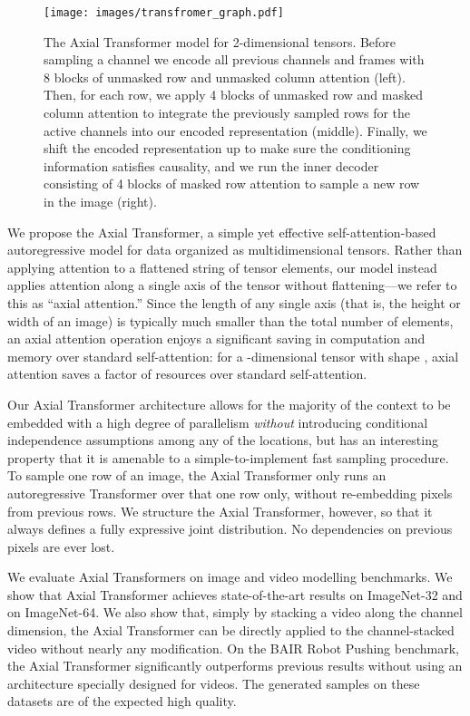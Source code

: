 \documentclass{article} \usepackage{iclr2020_conference,times}
\begin{document}
\begin{figure}[t]
    \centering
    \texttt{[image: images/transfromer\_graph.pdf]}
    \caption{The Axial Transformer model for 2-dimensional tensors. Before sampling a channel we encode all previous channels and frames with 8 blocks of unmasked row and unmasked column attention (left). Then, for each row, we apply 4 blocks of unmasked row and masked column attention to integrate the previously sampled rows for the active channels into our encoded representation (middle). Finally, we shift the encoded representation up to make sure the conditioning information satisfies causality, and we run the inner decoder consisting of 4 blocks of masked row attention to sample a new row in the image (right).}
    \label{fig:model}
\end{figure}

We propose the Axial Transformer, a simple yet effective self-attention-based autoregressive model for data organized as multidimensional tensors. Rather than applying attention to a flattened string of tensor elements, our model instead applies attention along a single axis of the tensor without flattening---we refer to this as ``axial attention.'' Since the length of any single axis (that is, the height or width of an image) is typically much smaller than the total number of elements, an axial attention operation enjoys a significant saving in computation and memory over standard self-attention: for a -dimensional tensor with shape , axial attention saves a  factor of resources over standard self-attention.



Our Axial Transformer architecture allows for the majority of the context  to be embedded with a high degree of parallelism \emph{without} introducing conditional independence assumptions among any of the locations, but has an interesting property that it is amenable to a simple-to-implement fast sampling procedure. To sample one row of an image, the Axial Transformer only runs an autoregressive Transformer over that one row only, without re-embedding pixels from previous rows. We structure the Axial Transformer, however, so that it always defines a fully expressive joint distribution. No dependencies on previous pixels are ever lost.



We evaluate Axial Transformers on image and video modelling benchmarks. We show that Axial Transformer achieves state-of-the-art results on ImageNet-32 and on ImageNet-64. We also show that, simply by stacking a video along the channel dimension, the Axial Transformer can be directly applied to the channel-stacked video without nearly any modification. On the BAIR Robot Pushing benchmark, the Axial Transformer significantly outperforms previous results without using an architecture specially designed for videos. The generated samples on these datasets are of the expected high quality.
\end{document}
